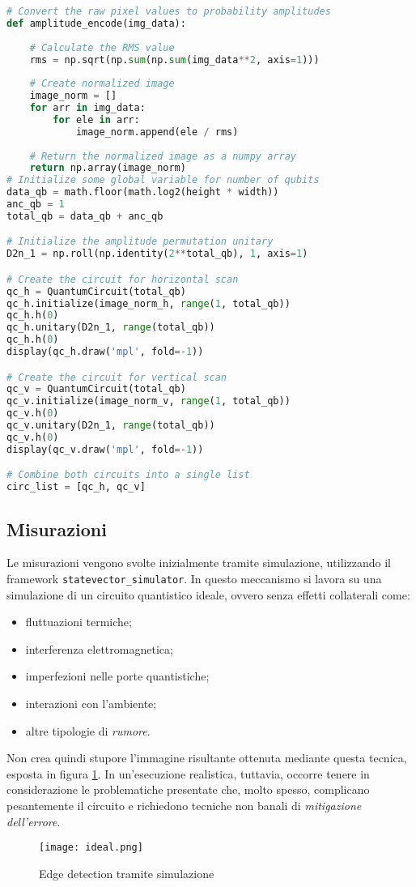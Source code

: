 \begin{lstlisting}[language=Python, 
    caption={Codice Python per creazione del circuito}, label=cod:circuit]
# Convert the raw pixel values to probability amplitudes
def amplitude_encode(img_data):
    
    # Calculate the RMS value
    rms = np.sqrt(np.sum(np.sum(img_data**2, axis=1)))
    
    # Create normalized image
    image_norm = []
    for arr in img_data:
        for ele in arr:
            image_norm.append(ele / rms)
        
    # Return the normalized image as a numpy array
    return np.array(image_norm)
# Initialize some global variable for number of qubits
data_qb = math.floor(math.log2(height * width))
anc_qb = 1
total_qb = data_qb + anc_qb

# Initialize the amplitude permutation unitary
D2n_1 = np.roll(np.identity(2**total_qb), 1, axis=1)

# Create the circuit for horizontal scan
qc_h = QuantumCircuit(total_qb)
qc_h.initialize(image_norm_h, range(1, total_qb))
qc_h.h(0)
qc_h.unitary(D2n_1, range(total_qb))
qc_h.h(0)
display(qc_h.draw('mpl', fold=-1))

# Create the circuit for vertical scan
qc_v = QuantumCircuit(total_qb)
qc_v.initialize(image_norm_v, range(1, total_qb))
qc_v.h(0)
qc_v.unitary(D2n_1, range(total_qb))
qc_v.h(0)
display(qc_v.draw('mpl', fold=-1))

# Combine both circuits into a single list
circ_list = [qc_h, qc_v]
\end{lstlisting}

\subsection{Misurazioni}
Le misurazioni vengono svolte inizialmente tramite simulazione, utilizzando 
il framework \texttt{statevector\_simulator}. In questo meccanismo si lavora su 
una simulazione di un circuito quantistico ideale, ovvero senza effetti collaterali come:
\begin{itemize}
    \item fluttuazioni termiche;
    \item interferenza elettromagnetica;
    \item imperfezioni nelle porte quantistiche;
    \item interazioni con l'ambiente;
    \item altre tipologie di \textit{rumore}.
\end{itemize}

Non crea quindi stupore l'immagine risultante ottenuta mediante
questa tecnica, esposta in figura \ref{fig:ideal}. 
In un'esecuzione realistica, tuttavia, occorre tenere in considerazione
le problematiche presentate che, molto spesso, complicano pesantemente
il circuito e richiedono tecniche non banali di \textit{mitigazione dell'errore}.

\begin{figure}
    \centering
    \texttt{[image: ideal.png]}
    \caption{Edge detection tramite simulazione}
    \label{fig:ideal}
\end{figure}